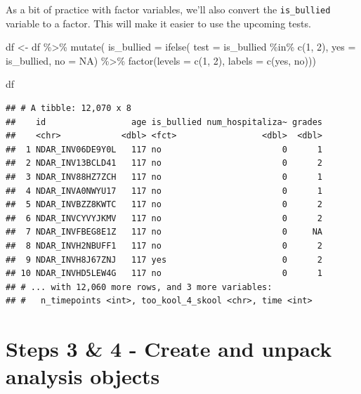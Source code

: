 \documentclass[
]{book}
\newenvironment{Shaded}{\begin{snugshade}}{\end{snugshade}}
\newcommand{\AttributeTok}[1]{\textcolor[rgb]{0.77,0.63,0.00}{#1}}
\newcommand{\ConstantTok}[1]{\textcolor[rgb]{0.00,0.00,0.00}{#1}}
\newcommand{\DecValTok}[1]{\textcolor[rgb]{0.00,0.00,0.81}{#1}}
\newcommand{\FunctionTok}[1]{\textcolor[rgb]{0.00,0.00,0.00}{#1}}
\newcommand{\NormalTok}[1]{#1}
\newcommand{\OtherTok}[1]{\textcolor[rgb]{0.56,0.35,0.01}{#1}}
\newcommand{\SpecialCharTok}[1]{\textcolor[rgb]{0.00,0.00,0.00}{#1}}
\newcommand{\StringTok}[1]{\textcolor[rgb]{0.31,0.60,0.02}{#1}}
\begin{document}
As a bit of practice with factor variables, we'll also convert the \texttt{is\_bullied} variable to a factor. This will make it easier to use the upcoming tests.

\begin{Shaded}
\begin{Highlighting}[]
\NormalTok{df }\OtherTok{\textless{}{-}}\NormalTok{ df }\SpecialCharTok{\%\textgreater{}\%} 
  \FunctionTok{mutate}\NormalTok{(}
    \AttributeTok{is\_bullied =} \FunctionTok{ifelse}\NormalTok{(}
        \AttributeTok{test =}\NormalTok{ is\_bullied }\SpecialCharTok{\%in\%} \FunctionTok{c}\NormalTok{(}\DecValTok{1}\NormalTok{, }\DecValTok{2}\NormalTok{),}
        \AttributeTok{yes =}\NormalTok{ is\_bullied,}
        \AttributeTok{no =} \ConstantTok{NA}\NormalTok{) }\SpecialCharTok{\%\textgreater{}\%} 
      \FunctionTok{factor}\NormalTok{(}\AttributeTok{levels =} \FunctionTok{c}\NormalTok{(}\DecValTok{1}\NormalTok{, }\DecValTok{2}\NormalTok{), }\AttributeTok{labels =} \FunctionTok{c}\NormalTok{(}\StringTok{\textquotesingle{}yes\textquotesingle{}}\NormalTok{, }\StringTok{\textquotesingle{}no\textquotesingle{}}\NormalTok{)))}

\NormalTok{df}
\end{Highlighting}
\end{Shaded}

\begin{verbatim}
## # A tibble: 12,070 x 8
##    id                 age is_bullied num_hospitaliza~ grades
##    <chr>            <dbl> <fct>                 <dbl>  <dbl>
##  1 NDAR_INV06DE9Y0L   117 no                        0      1
##  2 NDAR_INV13BCLD41   117 no                        0      2
##  3 NDAR_INV88HZ7ZCH   117 no                        0      1
##  4 NDAR_INVA0NWYU17   117 no                        0      1
##  5 NDAR_INVBZZ8KWTC   117 no                        0      2
##  6 NDAR_INVCYVYJKMV   117 no                        0      2
##  7 NDAR_INVFBEG8E1Z   117 no                        0     NA
##  8 NDAR_INVH2NBUFF1   117 no                        0      2
##  9 NDAR_INVH8J67ZNJ   117 yes                       0      2
## 10 NDAR_INVHD5LEW4G   117 no                        0      1
## # ... with 12,060 more rows, and 3 more variables:
## #   n_timepoints <int>, too_kool_4_skool <chr>, time <int>
\end{verbatim}

\hypertarget{steps-3-4---create-and-unpack-analysis-objects}{%
\section{Steps 3 \& 4 - Create and unpack analysis objects}\label{steps-3-4---create-and-unpack-analysis-objects}}
\end{document}
